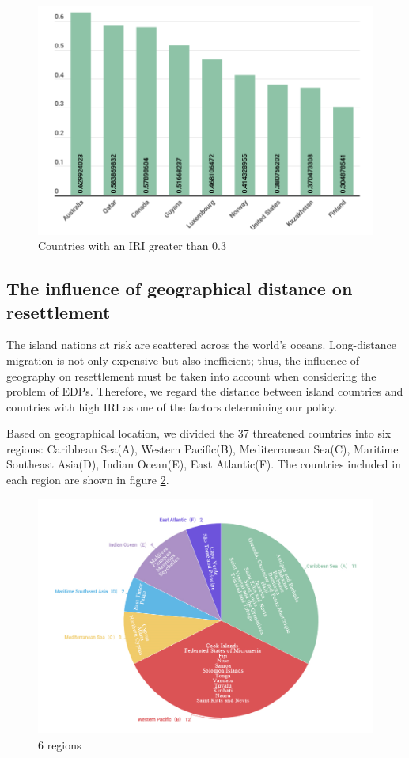 \documentclass[12pt]{article}  %
\begin{document}
\begin{figure}[htbp]
	\centering
	\includegraphics[width=.8\textwidth]{high_index_countries.png}
	\caption{Countries with an IRI greater than 0.3}\label{high_index_countries}
\end{figure}





\subsection{The influence of geographical distance on resettlement}

The island nations at risk are scattered across the world's oceans. Long-distance migration is not only expensive but also inefficient; thus, the influence of geography on resettlement must be taken into account when considering the problem of EDPs. Therefore, we regard the distance between island countries and countries with high IRI as one of the factors determining our policy.



Based on geographical location, we divided the 37 threatened countries into six regions: Caribbean Sea(A), Western Pacific(B), Mediterranean Sea(C), Maritime Southeast Asia(D), Indian Ocean(E), East Atlantic(F). The countries included in each region are shown in figure \ref{6_regions}.


\begin{figure}[htbp]
	\centering
	\includegraphics[width=.8\textwidth]{6_regions.png}
	\caption{ 6 regions}\label{6_regions}
\end{figure}
\end{document}
